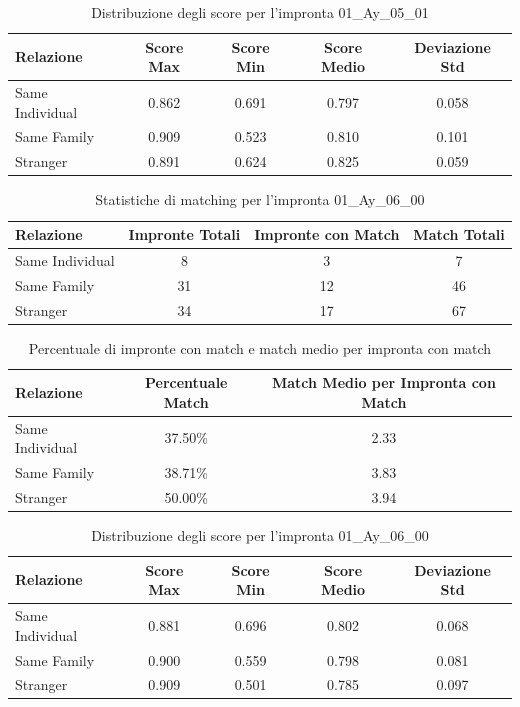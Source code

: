 \begin{table}[htbp]
\centering
\caption{Distribuzione degli score per l'impronta 01\_Ay\_05\_01}
\label{tab:scores_01_Ay_05_01}
\begin{tabular}{|l|c|c|c|c|}
\hline
\textbf{Relazione} & \textbf{Score Max} & \textbf{Score Min} & \textbf{Score Medio} & \textbf{Deviazione Std} \\
\hline
Same Individual & 0.862 & 0.691 & 0.797 & 0.058 \\
\hline
Same Family & 0.909 & 0.523 & 0.810 & 0.101 \\
\hline
Stranger & 0.891 & 0.624 & 0.825 & 0.059 \\
\hline
\end{tabular}
\end{table}


\begin{table}[htbp]
\centering
\caption{Statistiche di matching per l'impronta 01\_Ay\_06\_00}
\label{tab:results_01_Ay_06_00}
\begin{tabular}{|l|c|c|c|}
\hline
\textbf{Relazione} & \textbf{Impronte Totali} & \textbf{Impronte con Match} & \textbf{Match Totali} \\
\hline
Same Individual & 8 & 3 & 7 \\
\hline
Same Family & 31 & 12 & 46 \\
\hline
Stranger & 34 & 17 & 67 \\
\hline
\end{tabular}
\end{table}


\begin{table}[htbp]
\centering
\caption{Percentuale di impronte con match e match medio per impronta con match}
\label{tab:match_percentage_01_Ay_06_00}
\begin{tabular}{|l|c|c|}
\hline
\textbf{Relazione} & \textbf{Percentuale Match} & \textbf{Match Medio per Impronta con Match} \\
\hline
Same Individual & 37.50\% & 2.33 \\
\hline
Same Family & 38.71\% & 3.83 \\
\hline
Stranger & 50.00\% & 3.94 \\
\hline
\end{tabular}
\end{table}


\begin{table}[htbp]
\centering
\caption{Distribuzione degli score per l'impronta 01\_Ay\_06\_00}
\label{tab:scores_01_Ay_06_00}
\begin{tabular}{|l|c|c|c|c|}
\hline
\textbf{Relazione} & \textbf{Score Max} & \textbf{Score Min} & \textbf{Score Medio} & \textbf{Deviazione Std} \\
\hline
Same Individual & 0.881 & 0.696 & 0.802 & 0.068 \\
\hline
Same Family & 0.900 & 0.559 & 0.798 & 0.081 \\
\hline
Stranger & 0.909 & 0.501 & 0.785 & 0.097 \\
\hline
\end{tabular}
\end{table}


